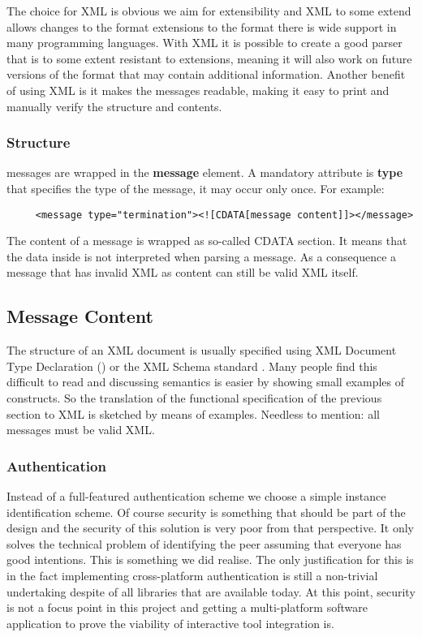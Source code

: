 \documentclass{article}
\begin{document}
   The choice for XML is obvious we aim for extensibility and XML to some
   extend allows changes to the format extensions to the format there is wide
   support in many programming languages. With XML it is possible to create a
   good parser that is to some extent resistant to extensions, meaning it will
   also work on future versions of the format that may contain additional
   information.  Another benefit of using XML is it makes the messages
   readable, making it easy to print and manually verify the structure and
   contents.

   \subsubsection{Structure} \label{ss:structure}

    \noindent messages are wrapped in the \textbf{message} element. A mandatory
    attribute is \textbf{type} that specifies the type of the message, it may
    occur only once. For example:
 
    \begin{verbatim}
     <message type="termination"><![CDATA[message content]]></message>\end{verbatim}

    The content of a message is wrapped as so-called CDATA section. It means
    that the data inside is not interpreted when parsing a message. As a
    consequence a message that has invalid XML as content can still be valid
    XML itself.

  \subsection{Message Content}

   The structure of an XML document is usually specified using XML Document
   Type Declaration (\cite{Sperberg-McQueen:06:EML}) or the XML Schema standard
   \cite{Malhotra:06:XSP}. Many people find this difficult to read and
   discussing semantics is easier by showing small examples of constructs. So
   the translation of the functional specification of the previous section to
   XML is sketched by means of examples. Needless to mention: all messages must
   be valid XML.

  \subsubsection{Authentication}

   Instead of a full-featured authentication scheme we choose a simple instance
   identification scheme. Of course security is something that should be part
   of the design and the security of this solution is very poor from that
   perspective. It only solves the technical problem of identifying the peer
   assuming that everyone has good intentions. This is something we did
   realise. The only justification for this is in the fact implementing
   cross-platform authentication is still a non-trivial undertaking despite of
   all libraries that are available today.  At this point, security is not a
   focus point in this project and getting a multi-platform software
   application to prove the viability of interactive tool integration is.
\end{document}

